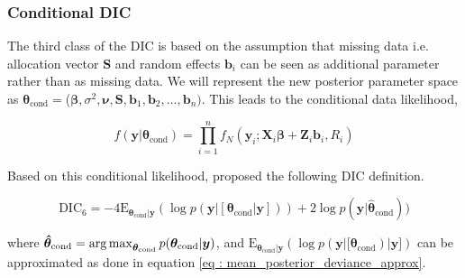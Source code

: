 \subsubsection{Conditional DIC}
The third class of the DIC is based on the assumption that missing data i.e. allocation vector $\boldsymbol{S}$ and random effects $\boldsymbol{b}_i$ can be seen as additional parameter rather than as missing data. We will represent the new posterior parameter space as $\boldsymbol{\theta}_\text{cond} = $($\boldsymbol{\beta}, \sigma^2, \boldsymbol{\nu}, \boldsymbol{S}, \boldsymbol{b}_1, \boldsymbol{b}_2, ..., \boldsymbol{b}_n)$. This leads to the conditional data likelihood,

\begin{equation}
\label{eq : conditional_data_likelihood}
f(\boldsymbol{y}|\boldsymbol{\theta}_\text{cond}) = \prod_{i=1}^n f_N(\boldsymbol{y}_i; \boldsymbol{X}_i\boldsymbol{\beta} + \boldsymbol{Z}_i \boldsymbol{b}_i, R_i)
\end{equation}

Based on this conditional likelihood, \citet{celeux_deviance_2006} proposed the following DIC definition.

\begin{equation}
\label{eq : DIC6}
\text{DIC}_6 = -4\text{E}_{\boldsymbol{\theta}_\text{cond}|\boldsymbol{y}} (\log{p(\boldsymbol{y}|[\boldsymbol{\theta}_{\text{cond}}|\boldsymbol{y}])}) + 2\log{p(\boldsymbol{y}|\boldsymbol{\hat{\theta}}_\text{cond})})
\end{equation}

where
$\boldsymbol{\hat{\theta}}_\text{cond} = \operatorname*{arg\,max}_{\boldsymbol{\theta}_\text{cond}}p(\boldsymbol{\theta}_\text{cond}|\boldsymbol{y})$, and $\text{E}_{\boldsymbol{\theta}_\text{cond}|\boldsymbol{y}} (\log{p(\boldsymbol{y}|[\boldsymbol{\theta}_{\text{cond}})}|\boldsymbol{y}])$ can be approximated as done in equation \ref{eq : mean_posterior_deviance_approx}.